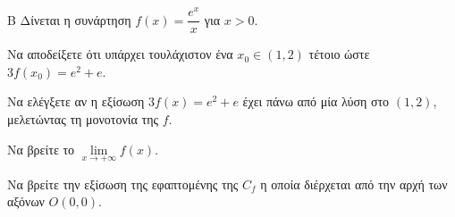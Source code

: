 \begin{thema}{Β}
Δίνεται η συνάρτηση $f(x) = \dfrac{e^x}{x}$ για $x > 0$.
\begin{erwthma}
\item Να αποδείξετε ότι υπάρχει τουλάχιστον ένα $x_0 \in (1, 2)$ τέτοιο ώστε $3f(x_0) = e^2+e$.
\item Να ελέγξετε αν η εξίσωση $3f(x) = e^2+e$ έχει πάνω από μία λύση στο $(1, 2)$, μελετώντας τη μονοτονία της $f$.
\item Να βρείτε το $\lim\limits_{x \to +\infty} f(x)$.
\item Να βρείτε την εξίσωση της εφαπτομένης της $C_f$ η οποία διέρχεται από την αρχή των αξόνων $O(0,0)$.
\end{erwthma}
\end{thema}

